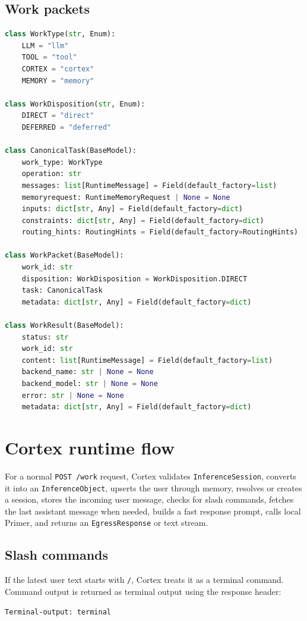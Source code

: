 \documentclass[11pt,a4paper]{article}
\begin{document}
\subsection{Work packets}
\begin{lstlisting}[language=Python]
class WorkType(str, Enum):
    LLM = "llm"
    TOOL = "tool"
    CORTEX = "cortex"
    MEMORY = "memory"

class WorkDisposition(str, Enum):
    DIRECT = "direct"
    DEFERRED = "deferred"

class CanonicalTask(BaseModel):
    work_type: WorkType
    operation: str
    messages: list[RuntimeMessage] = Field(default_factory=list)
    memoryrequest: RuntimeMemoryRequest | None = None
    inputs: dict[str, Any] = Field(default_factory=dict)
    constraints: dict[str, Any] = Field(default_factory=dict)
    routing_hints: RoutingHints = Field(default_factory=RoutingHints)

class WorkPacket(BaseModel):
    work_id: str
    disposition: WorkDisposition = WorkDisposition.DIRECT
    task: CanonicalTask
    metadata: dict[str, Any] = Field(default_factory=dict)

class WorkResult(BaseModel):
    status: str
    work_id: str
    content: list[RuntimeMessage] = Field(default_factory=list)
    backend_name: str | None = None
    backend_model: str | None = None
    error: str | None = None
    metadata: dict[str, Any] = Field(default_factory=dict)
\end{lstlisting}

\section{Cortex runtime flow}
For a normal \texttt{POST /work} request, Cortex validates \texttt{InferenceSession}, converts it into an \texttt{InferenceObject}, upserts the user through memory, resolves or creates a session, stores the incoming user message, checks for slash commands, fetches the last assistant message when needed, builds a fast response prompt, calls local Primer, and returns an \texttt{EgressResponse} or text stream.

\subsection{Slash commands}
If the latest user text starts with \texttt{/}, Cortex treats it as a terminal command. Command output is returned as terminal output using the response header:
\begin{lstlisting}
Terminal-output: terminal
\end{lstlisting}
\end{document}
